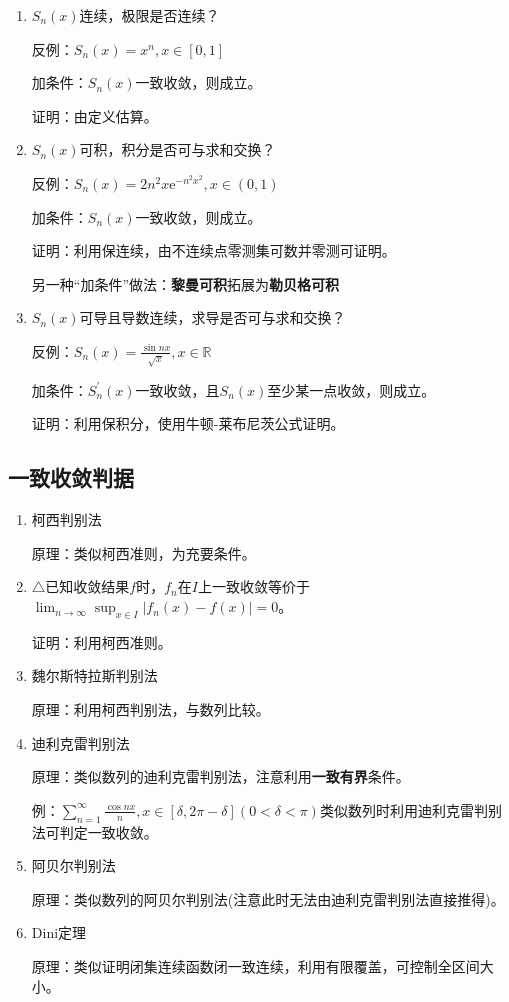 \documentclass[a4paper,UTF8]{ctexart}
\begin{document}
\begin{enumerate}
\item $S_n(x)$连续，极限是否连续？

反例：$S_n(x)=x^n,x\in[0,1]$

加条件：$S_n(x)$一致收敛，则成立。

证明：由定义估算。

\item $S_n(x)$可积，积分是否可与求和交换？

反例：$S_n(x)=2n^2x\mathrm{e}^{-n^2x^2},x\in(0,1)$

加条件：$S_n(x)$一致收敛，则成立。

证明：利用保连续，由不连续点零测集可数并零测可证明。

另一种“加条件”做法：\textbf{黎曼可积}拓展为\textbf{勒贝格可积}

\item $S_n(x)$可导且导数连续，求导是否可与求和交换？

反例：$S_n(x)=\frac{\sin nx}{\sqrt{x}},x\in\mathbb{R}$

加条件：$S_n^\prime(x)$一致收敛，且$S_n(x)$至少某一点收敛，则成立。

证明：利用保积分，使用牛顿-莱布尼茨公式证明。
\end{enumerate}

\subsection{一致收敛判据}
\begin{enumerate}
\item 柯西判别法

原理：类似柯西准则，为充要条件。

\item $\triangle$已知收敛结果$f$时，$f_n$在$I$上一致收敛等价于$\lim_{n\to\infty}\sup_{x\in I}|f_n(x)-f(x)|=0$。

证明：利用柯西准则。

\item 魏尔斯特拉斯判别法

原理：利用柯西判别法，与数列比较。

\item 迪利克雷判别法

原理：类似数列的迪利克雷判别法，注意利用\textbf{一致有界}条件。

例：$\sum_{n=1}^\infty\frac{\cos nx}{n},x\in[\delta,2\pi-\delta](0<\delta<\pi)$类似数列时利用迪利克雷判别法可判定一致收敛。

\item 阿贝尔判别法

原理：类似数列的阿贝尔判别法(注意此时无法由迪利克雷判别法直接推得)。

\item Dini定理

原理：类似证明闭集连续函数闭一致连续，利用有限覆盖，可控制全区间大小。
\end{enumerate}
\end{document}
